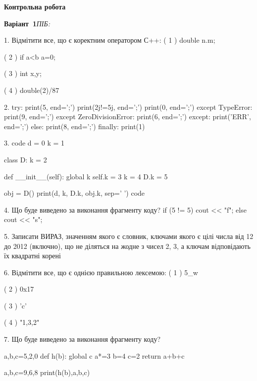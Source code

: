 \documentclass[11pt]{article}
\begin{document}
{\large\textbf{Контрольна робота}}

\textbf{Варіант \No\,1}\hfill \textit{ПІБ:}\,\underline{\hspace{60mm}}
\vspace{4mm}

1. %
Відмітити все, що є коректним оператором С++:
( 1 ) double n.m;

( 2 ) if a<b a=0;

( 3 ) {int x,y;}

( 4 ) double(2)/87


2. 
try:
    print(5, end=';')
    print(2j!=5j, end=';')
    print(0, end=';')
except TypeError:
    print(9, end=';')
except ZeroDivisionError:
    print(6, end=';')
except:
    print('ERR', end=';')
else:
    print(8, end=';')
finally:
    print(1)


3. 
code
d = 0
k = 1

class D:
    k = 2
    
    def __init__(self):
global k        self.k = 3
        k = 4
        D.k = 5

obj = D()
print(d, k, D.k, obj.k, sep=' ')
code


4. Що буде виведено за виконання фрагменту коду?
if (5 != 5)
    cout << "f";
else
    cout << "s";



5. 
Записати ВИРАЗ, значенням якого є словник, ключами якого є цілі числа від 12 до 2012 (включно), що не діляться на жодне з чисел 2, 3, а ключам відповідають їх квадратні корені 

6. %
Відмітити все, що є однією правильною лексемою:
( 1 ) 5_w

( 2 ) 0x17

( 3 ) 'c'

( 4 ) "1,3,2"


7. Що буде виведено за виконання фрагменту коду?

a,b,c=5,2,0
def h(b):
global c    a*=3
    b=4
    c=2
    return a+b+c

a,b,c=9,6,8
print(h(b),a,b,c)

\end{document}
